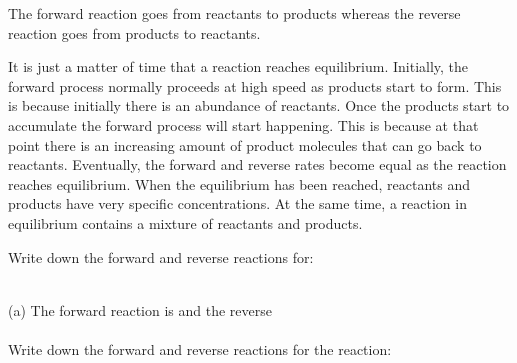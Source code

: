 \documentclass[main.tex]{subfiles}
\begin{document}
\begin{description}
\begin{marginfigure}[-0cm]
\caption{The forward reaction goes from reactants to products whereas the reverse reaction goes from products to reactants. }
\end{marginfigure}%
\item[\docfilehook{Equilibrium and concentration}{Equilibrium and concentration}] 
It is just a matter of time that a reaction reaches equilibrium. Initially, the forward process normally proceeds at high speed as products start to form. This is because initially there is an abundance of reactants. Once the products start to accumulate the forward process will start happening. This is because at that point there is an increasing amount of product molecules that can go back to reactants. Eventually, the forward and reverse rates become equal as the reaction reaches equilibrium. When the equilibrium has been reached, reactants and products have very specific concentrations. At the same time, a reaction in equilibrium contains a mixture of reactants and products.

\begin{example} %
Write down the forward and reverse reactions for:
\begin{center}\end{center}
\\
(a) The forward reaction is  and the reverse 
\\
\faDiamond\ \\
Write down the forward and reverse reactions for the reaction: \begin{center}\end{center}

\end{example}%
%
%


\end{description}
\end{document}

